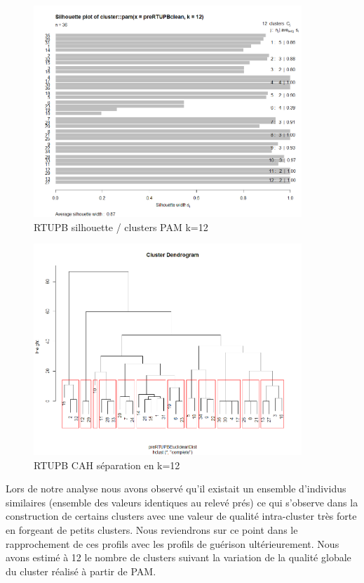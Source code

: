 \begin{figure}[H]
\centering
\includegraphics[width=0.90\textwidth]{../Fig/RTUPB/rtupb-sil-k12-pre.png}
\caption{RTUPB silhouette / clusters PAM k=12 }
\end{figure}

\begin{figure}[H]
\centering
\includegraphics[width=0.90\textwidth]{../Fig/RTUPB/rtupb-cah-k12-pre.png}
\caption{RTUPB CAH séparation en k=12 }
\end{figure}


%
%

Lors de notre analyse nous avons observé qu'il existait un ensemble d'individus similaires (ensemble des valeurs
identiques au relevé prés) ce qui s'observe dans la construction de certains clusters avec une valeur de qualité 
intra-cluster très forte en forgeant de petits clusters. Nous reviendrons sur ce point dans le rapprochement de ces
profils avec les profils de guérison ultérieurement. Nous avons estimé à 12 le nombre de clusters suivant la variation 
de la qualité globale  du cluster réalisé à partir de PAM. 



